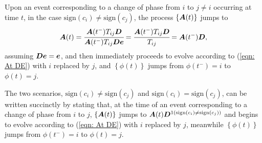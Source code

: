 Upon an event corresponding to a change of phase from \(i\) to \(j\neq i\) occurring at time \(t\), in the case \(\mathrm{sign}(c_i)\neq \mathrm{sign}(c_j)\), the process \(\{\boldsymbol A(t)\}\) jumps to 
\[\boldsymbol A(t) = \cfrac{\boldsymbol A({t^-}) T_{ij}\boldsymbol{D}}{\boldsymbol A({t^-}) T_{ij} \boldsymbol{D} \boldsymbol e} = \cfrac{\boldsymbol A({t^-}) T_{ij}\boldsymbol{D}}{T_{ij} } = \boldsymbol A({t^-}) \boldsymbol{D}, \]
assuming \(\boldsymbol D\boldsymbol e=\boldsymbol e\), and then immediately proceeds to evolve according to (\ref{eqn: At DE}) with \(i\) replaced by \(j\), and \(\left\{{\phi}(t)\right\}\) jumps from \({\phi}(t^-)=i\) to \({\phi}(t)=j\). 

The two scenarios, \(\mathrm{sign}(c_i)\neq \mathrm{sign}(c_j)\) and \(\mathrm{sign}(c_i)= \mathrm{sign}(c_j)\), can be written succinctly by stating that, at the time of an event corresponding to a change of phase from \(i\) to \(j\), \(\{\boldsymbol A(t)\}\) jumps to \(\boldsymbol A(t)\boldsymbol{D}^{1(\mathrm{sign}(c_i)\neq \mathrm{sign}(c_j))}\) and begins to evolve according to (\ref{eqn: At DE}) with \(i\) replaced by \(j\), meanwhile \(\left\{{\phi}(t)\right\}\) jumps from \(\phi(t^-)=i\) to \(\phi(t)=j\). %

